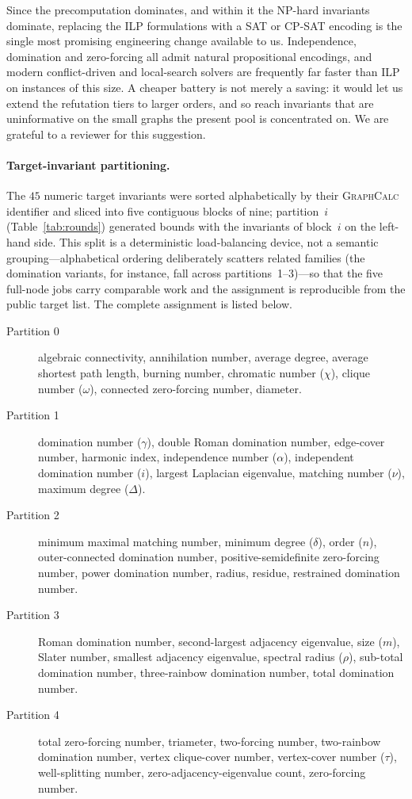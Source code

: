 \documentclass[]{ceurart}
\begin{document}
Since the precomputation dominates, and within it the NP-hard invariants
dominate, replacing the ILP formulations with a SAT or CP-SAT encoding is the
single most promising engineering change available to us. Independence,
domination and zero-forcing all admit natural propositional encodings, and
modern conflict-driven and local-search solvers are frequently far faster than
ILP on instances of this size. A cheaper battery is not merely a saving: it
would let us extend the refutation tiers to larger orders, and so reach
invariants that are uninformative on the small graphs the present pool is
concentrated on. We are grateful to a reviewer for this suggestion.

\paragraph{Target-invariant partitioning.}
The $45$ numeric target invariants were sorted alphabetically by their
\textsc{GraphCalc} identifier and sliced into five contiguous blocks of nine; partition~$i$
(Table~\ref{tab:rounds}) generated bounds with the invariants of block~$i$ on the left-hand
side. This split is a deterministic load-balancing device, not a semantic grouping---alphabetical
ordering deliberately scatters related families (the domination variants, for instance, fall across
partitions~1--3)---so that the five full-node jobs carry comparable work and the assignment is
reproducible from the public target list. The complete assignment is listed below.

\begin{description}
  \item[Partition 0] algebraic connectivity, annihilation number, average degree, average
    shortest path length, burning number, chromatic number ($\chi$), clique number ($\omega$),
    connected zero-forcing number, diameter.
  \item[Partition 1] domination number ($\gamma$), double Roman domination number, edge-cover
    number, harmonic index, independence number ($\alpha$), independent domination number ($i$),
    largest Laplacian eigenvalue, matching number ($\nu$), maximum degree ($\Delta$).
  \item[Partition 2] minimum maximal matching number, minimum degree ($\delta$), order ($n$),
    outer-connected domination number, positive-semidefinite zero-forcing number, power domination
    number, radius, residue, restrained domination number.
  \item[Partition 3] Roman domination number, second-largest adjacency eigenvalue, size ($m$),
    Slater number, smallest adjacency eigenvalue, spectral radius ($\rho$), sub-total domination
    number, three-rainbow domination number, total domination number.
  \item[Partition 4] total zero-forcing number, triameter, two-forcing number, two-rainbow
    domination number, vertex clique-cover number, vertex-cover number ($\tau$), well-splitting
    number, zero-adjacency-eigenvalue count, zero-forcing number.
\end{description}
\end{document}
